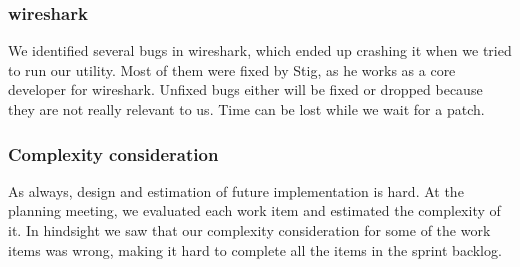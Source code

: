 \subsubsection{\Gls{wireshark}} 
We identified several bugs in \Gls{wireshark}, which ended up crashing it when we tried to run our \gls{utility}. Most of them were fixed by Stig, as he works as a core developer for \Gls{wireshark}. Unfixed bugs either will be fixed or dropped because they are not really relevant to us. Time can be lost while we wait for a patch.

\subsubsection{Complexity consideration}
As always, design and estimation of future implementation is hard. At the planning meeting, we evaluated each work item and estimated the complexity of it. In hindsight we saw that our complexity consideration for some of the work items was wrong, making it hard to complete all the items in the sprint backlog.
